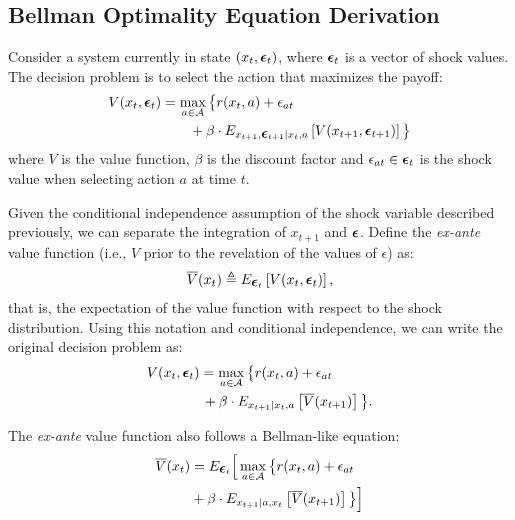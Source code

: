 \documentclass{article}
\renewcommand{\vec}[1]{\mbox{\bm{$#1$}}}
\begin{document}
\subsection{Bellman Optimality Equation Derivation}

Consider a system currently in state $(x_t,\vec{\epsilon}_t)$, where $\vec{\epsilon}_t$ is a vector of shock values. The decision problem is to select the action that maximizes the payoff:
\begin{align}
\begin{split}
V(x_t,\vec{\epsilon}_t) & = \max_{a\in\mathcal{A}} \big\{r(x_t,a)+\epsilon_{at} \\
& \qquad + \beta \cdot E_{x_{t+1},\vec{\epsilon}_{t+1}|x_t,a} \left[V(x_{t+1},\vec{\epsilon}_{t+1})\right] \big\} \\
\end{split}
\end{align} 
where $V$ is the value function, $\beta$ is the discount factor and $\epsilon_{at} \in \vec{\epsilon}_t$ is the shock value when selecting action $a$ at time $t$.


Given the conditional independence assumption of the shock variable described previously, we can separate the integration of $x_{t+1}$ and $\vec{\epsilon}$. Define the \emph{ex-ante} value function (i.e., $V$ prior to the revelation of the values of $\epsilon$) as:
\begin{eqnarray}\label{eq:def_exante}
\overline{V}(x_t)
\triangleq 
E_{\vec{\epsilon}_t} \left[ V(x_t, \vec{\epsilon}_t) \right],
\end{eqnarray}
that is, the expectation of the value function with respect to the shock distribution. Using this notation and conditional independence, we can write the original decision problem as:
%
\begin{align}
\begin{split}
V(x_t,\vec{\epsilon}_t) & =\max_{a\in\mathcal{A}} \big\{ \vphantom{V} r(x_t,a)+\epsilon_{at}  \\
&  \, +\beta \cdot E_{x_{t+1}|x_t,a} \left[ \overline{V}(x_{t+1}) \right] \vphantom{r(x_t, a)} \big\}.
\nonumber
\end{split}
\end{align}


The \emph{ex-ante} value function also follows a Bellman-like equation:
\begin{align} \label{eq:exantebellman}
\begin{split}
\overline{V}(x_t) & = E_{\vec{\epsilon}_t}\Big[\max_{a\in\mathcal{A}} \big\{r(x_t,a)+\epsilon_{at} \\
& +\beta  \cdot E_{x_{t+1}|a,x_t} \left[ \overline{V}(x_{t+1}) \right] \big\}\Big]
\end{split}
\end{align}
\end{document}
